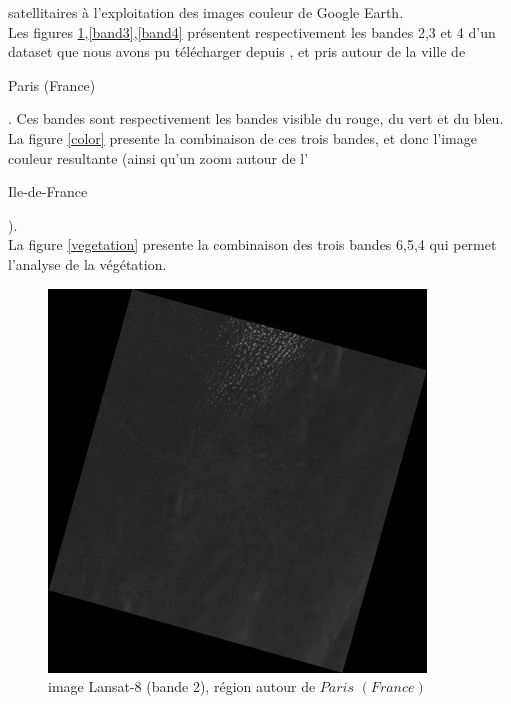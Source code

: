\documentclass{book}
\begin{document}
satellitaires à l'exploitation des images couleur de Google Earth.\\
Les figures \ref{band2},\ref{band3},\ref{band4} présentent respectivement les bandes 2,3 et 4 d'un dataset que nous
avons pu télécharger depuis \cite{landsat8}, et pris autour de la ville
de \begin{itshape}Paris (France)\end{itshape}. Ces bandes sont respectivement les bandes visible du rouge, du vert et du bleu.\\
La figure \ref{color} presente la combinaison de ces trois bandes, et donc l'image couleur resultante (ainsi qu'un zoom autour de l'\begin{itshape}Ile-de-France\end{itshape}).\\
La figure \ref{vegetation} presente la combinaison des trois bandes 6,5,4 qui permet l'analyse de la végétation.\\

\begin{figure}[H]
\begin{center}
\includegraphics[scale=0.8]{LC81990262015158LGN00_B2r.jpg}
\end{center}
\caption{image Lansat-8 (bande 2), région autour de $Paris$ $(France)$}
\label{band2}
\end{figure}
\end{document}
